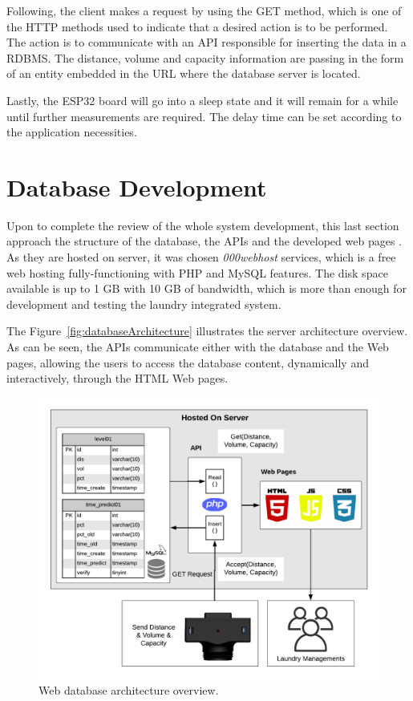 Following, the client makes a request by using the GET method, which is one of the \gls{HTTP} methods used to indicate that a desired action is to be performed. The action is to communicate with an \gls{API} responsible for inserting the data in a \gls{RDBMS}. The distance, volume and capacity information are passing in the form of an entity embedded in the \gls{URL} where the database server is located.

Lastly, the ESP32 board will go into a sleep state and it will remain for a while until further measurements are required. The delay time can be set according to the application necessities.


\section{Database Development}\label{section:database}

Upon to complete the review of the whole system development, this last section approach the structure of the database, the \gls{API}s and the developed web pages \cite{COELHO:2019}. As they are hosted on server, it was chosen \textit{000webhost} services, which is a free web hosting fully-functioning with \gls{PHP} and My\gls{SQL} features. The disk space available is up to 1 GB with 10 GB of bandwidth, which is more than enough for development and testing the laundry integrated system.

The Figure~\ref{fig:databaseArchitecture} illustrates the server architecture overview. As can be seen, the \gls{API}s communicate either with the database and the Web pages, allowing the users to access the database content, dynamically and interactively, through the \gls{HTML} Web pages.
 
\begin{figure}[h!]
    \centering
    \includegraphics[scale=0.75]{images/Development/web_database/database_overview.pdf}
    \caption{Web database architecture overview.}
    \label{fig:databaArchitecture}
\end{figure}

